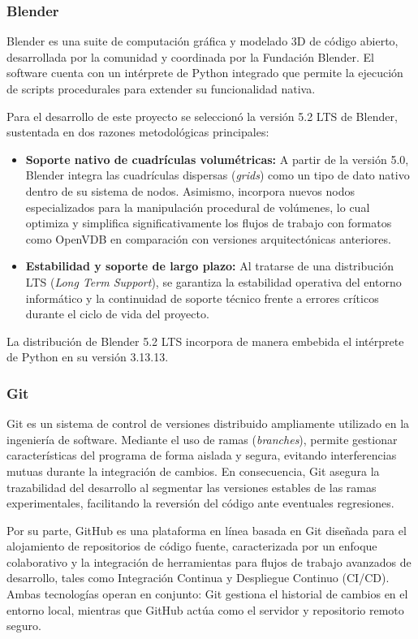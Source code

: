 \subsubsection{Blender}
Blender es una suite de computación gráfica y modelado 3D de código abierto, desarrollada 
por la comunidad y coordinada por la Fundación Blender. El software cuenta con un 
intérprete de Python integrado que permite la ejecución de scripts procedurales para 
extender su funcionalidad nativa.
\medskip

Para el desarrollo de este proyecto se seleccionó la versión 5.2 LTS de Blender, sustentada 
en dos razones metodológicas principales:
\begin{itemize}
    \item \textbf{Soporte nativo de cuadrículas volumétricas:} A partir de la versión 5.0, 
    Blender integra las cuadrículas dispersas (\textit{grids}) como un tipo de dato nativo 
    dentro de su sistema de nodos. Asimismo, incorpora nuevos nodos especializados para 
    la manipulación procedural de volúmenes, lo cual optimiza y simplifica 
    significativamente los flujos de trabajo con formatos como OpenVDB en comparación con 
    versiones arquitectónicas anteriores.
    \item \textbf{Estabilidad y soporte de largo plazo:} Al tratarse de una distribución 
    LTS (\textit{Long Term Support}), se garantiza la estabilidad operativa del entorno 
    informático y la continuidad de soporte técnico frente a errores críticos durante 
    el ciclo de vida del proyecto.
\end{itemize}

La distribución de Blender 5.2 LTS incorpora de manera embebida el intérprete de Python en 
su versión 3.13.13.

\subsubsection{Git}
Git es un sistema de control de versiones distribuido ampliamente utilizado en la ingeniería 
de software. Mediante el uso de ramas (\textit{branches}), permite gestionar características 
del programa de forma aislada y segura, evitando interferencias mutuas durante la 
integración de cambios. En consecuencia, Git asegura la trazabilidad del desarrollo al 
segmentar las versiones estables de las ramas experimentales, facilitando la reversión del 
código ante eventuales regresiones.
\medskip

Por su parte, GitHub es una plataforma en línea basada en Git diseñada para el alojamiento 
de repositorios de código fuente, caracterizada por un enfoque colaborativo y la integración 
de herramientas para flujos de trabajo avanzados de desarrollo, tales como Integración 
Continua y Despliegue Continuo (CI/CD). Ambas tecnologías operan en conjunto: Git gestiona 
el historial de cambios en el entorno local, mientras que GitHub actúa como el servidor y 
repositorio remoto seguro.

